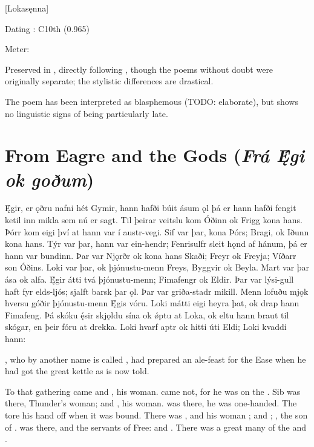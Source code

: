 [Lokasęnna]

\begin{flushright}%
Dating \parencite{Sapp2022}: C10th (0.965)

Meter: \Ljodahattr%
\end{flushright}

Preserved in \Regius, directly following \Hymiskvida, though the poems without doubt were originally separate; the stylistic differences are drastical.

The poem has been interpreted as blasphemous (TODO: elaborate), but shows no linguistic signs of being particularly late.

\sectionline

\section{From Eagre and the Gods (\emph{Frá Ę́gi ok goðum})}

\bpg\bpa Ę́gir, er ǫðru nafni hét Gymir, hann hafði búit ásum ǫl þá er hann hafði fengit ketil inn mikla sem nú er sagt. Til þeirar veitslu kom Óðinn ok Frigg kona hans. Þórr kom eigi því at hann var í austr-vegi. Sif var þar, kona Þórs; Bragi, ok Iðunn kona hans. Týr var þar, hann var ein-hendr; Fenrisulfr sleit hǫnd af hánum, þá er hann var bundinn. Þar var Njǫrðr ok kona hans Skaði; Freyr ok Freyja; Víðarr son Óðins. Loki var þar, ok þjónustu-menn Freys, Byggvir ok Beyla. Mart var þar ása ok alfa. Ę́gir átti tvá þjónustu-menn; Fimafengr ok Eldir. Þar var lýsi-gull haft fyr elds-ljós; sjalft barsk þar ǫl. Þar var griða-stadr mikill. Menn lofuðu mjǫk hversu góðir þjónustu-menn Ę́gis vóru. Loki mátti eigi heyra þat, ok drap hann Fimafeng. Þá skóku ę́sir skjǫldu sína ok ǿptu at Loka, ok eltu hann braut til skógar, en þeir fóru at drekka. Loki hvarf aptr ok hitti úti Eldi; Loki kvaddi hann:\epa

\bpb {}, who by another name is called , had prepared an ale-feast for the Ease when he had got the great kettle as is now told.

To that gathering came  and , his woman.  came not, for he was on the . Sib was there, Thunder’s woman;  and , his woman.  was there, he was one-handed. The  tore his hand off when it was bound. There was , and his woman ;  and ; , the son of .  was there, and the servants of Free:  and . There was a great many of the  and .


